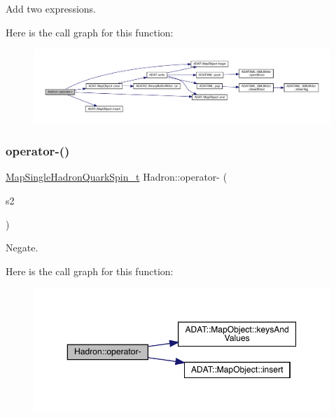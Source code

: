 Add two expressions. 

Here is the call graph for this function\+:\nopagebreak
\begin{figure}[H]
\begin{center}
\leavevmode
\includegraphics[width=350pt]{d1/daf/namespaceHadron_a168571d9c710321169dad756440c1952_cgraph}
\end{center}
\end{figure}
\mbox{\label{namespaceHadron_af6e03647b0a1cac007a84d630c583dcb}} 
\subsubsection{\texorpdfstring{operator-\/()}{operator-()}\hspace{0.1cm}{\footnotesize\ttfamily [1/6]}}
{\footnotesize\ttfamily \mbox{\hyperlink{namespaceHadron_a22279e56b59508dc8dd2c8991dc911fd}{Map\+Single\+Hadron\+Quark\+Spin\+\_\+t}} Hadron\+::operator-\/ (\begin{DoxyParamCaption}\item[{const \mbox{\hyperlink{namespaceHadron_a22279e56b59508dc8dd2c8991dc911fd}{Map\+Single\+Hadron\+Quark\+Spin\+\_\+t}} \&}]{s2 }\end{DoxyParamCaption})}



Negate. 

Here is the call graph for this function\+:\nopagebreak
\begin{figure}[H]
\begin{center}
\leavevmode
\includegraphics[width=350pt]{d1/daf/namespaceHadron_af6e03647b0a1cac007a84d630c583dcb_cgraph}
\end{center}
\end{figure}
\mbox{\label{namespaceHadron_a47e695607c9fe7e70da22c43d0065b91}} 
